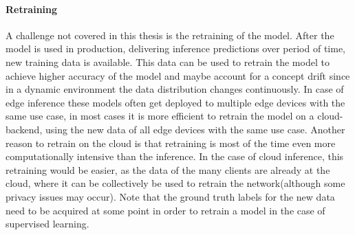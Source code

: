 \paragraph{Retraining}
A challenge not covered in this thesis is the retraining of the model. After the model is used in production, delivering inference predictions over period of time, new training data is available. This data can be used to retrain the model to achieve higher accuracy of the model and maybe account for a concept drift since in a dynamic environment the data distribution changes continuously.
In case of edge inference these models often get deployed to multiple edge devices with the same use case, in most cases it is more efficient to retrain the model on a cloud-backend, using the new data of all edge devices with the same use case. Another reason to retrain on the cloud is that retraining is most of the time even more computationally intensive than the inference.
In the case of cloud inference, this retraining would be easier, as the data of the many clients are already at the cloud, where it can be collectively be used to retrain the network(although some privacy issues may occur).
Note that the ground truth labels for the new data need to be acquired at some point in order to retrain a model in the case of supervised learning.
\endinput 
